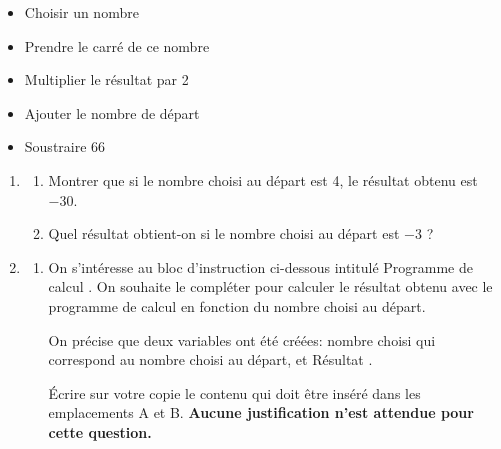 \documentclass[11pt]{article}
\begin{document}
\medskip

\begin{itemize}
\item[$\bullet~~$]Choisir un nombre
\item[$\bullet~~$]Prendre le carré de ce nombre
\item[$\bullet~~$]Multiplier le résultat par 2
\item[$\bullet~~$]Ajouter le nombre de départ
\item[$\bullet~~$]Soustraire 66
\end{itemize}

\medskip

\begin{enumerate}
\item 
	\begin{enumerate}
		\item Montrer que si le nombre choisi au départ est 4, le résultat obtenu est $-30$.
		\item  Quel résultat obtient-on si le nombre choisi au départ est $-3$ ?
	\end{enumerate}
\item 
	\begin{enumerate}
		\item On s'intéresse au bloc d'instruction ci-dessous intitulé \og Programme de calcul \fg.
On souhaite le compléter pour calculer le résultat obtenu avec le programme de calcul en fonction du nombre choisi au départ.

On précise que deux variables ont été créées: \og nombre choisi\fg{} qui correspond au nombre choisi au départ, et \og Résultat \fg.

\begin{center}
\begin{scratch}
\end{scratch}
\end{center}

Écrire sur votre copie le contenu qui doit être inséré dans les emplacements A et B. 
\textbf{Aucune justification n'est attendue pour cette question.}


\end{enumerate}
\end{enumerate}
\end{document}
